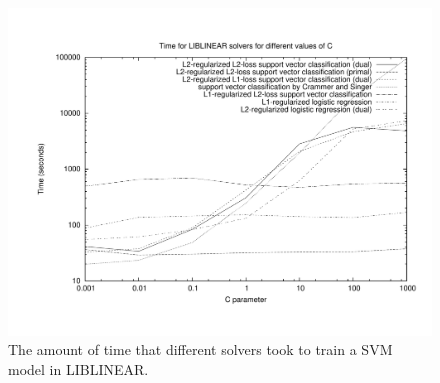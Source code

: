 \documentclass[12pt,oneside]{book}
\begin{document}
\begin{figure}[t]
\centering
\includegraphics[width=\columnwidth]{figures/gnuplot-calls-liblinear-time}
\caption{The amount of time that different solvers took to train a SVM
  model in LIBLINEAR.}
\label{fig:gnuplot-calls-liblinear-time}
\end{figure}
\end{document}
